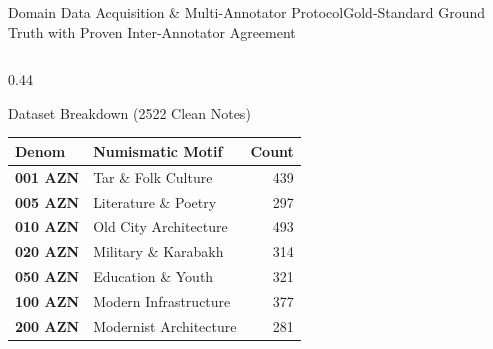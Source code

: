 \begin{frame}{Domain Data Acquisition \& Multi-Annotator Protocol}{Gold-Standard Ground Truth with Proven Inter-Annotator Agreement}
\begin{columns}[c]
        \begin{column}{0.44\textwidth}
            \begin{card}{Dataset Breakdown (2522 Clean Notes)}
                \centering
                \scriptsize
                \renewcommand{\arraystretch}{1.05}
                \begin{tabular}{l l r}
                    \toprule
                    \textbf{Denom} & \textbf{Numismatic Motif} & \textbf{Count} \\
                    \midrule
                    \textbf{001 AZN} & Tar \& Folk Culture & 439 \\
                    \textbf{005 AZN} & Literature \& Poetry & 297 \\
                    \textbf{010 AZN} & Old City Architecture & 493 \\
                    \textbf{020 AZN} & Military \& Karabakh & 314 \\
                    \textbf{050 AZN} & Education \& Youth & 321 \\
                    \textbf{100 AZN} & Modern Infrastructure & 377 \\
                    \textbf{200 AZN} & Modernist Architecture & 281 \\
                    \bottomrule
                \end{tabular}
            \end{card}
            
            \vspace{0.12cm}
        \end{column}
    \end{columns}
\end{frame}


